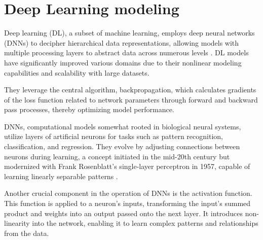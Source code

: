\section{Deep Learning modeling}

Deep learning (DL), a subset of machine learning, employs deep neural networks (DNNs) to decipher hierarchical data representations, allowing models with multiple processing layers to abstract data across numerous levels \cite{LeCun2015DeepLearning, Sarker2021DeepDirections}. DL models have significantly improved various domains due to their nonlinear modeling capabilities and scalability with large datasets.

They leverage the central algorithm, backpropagation, which calculates gradients of the loss function related to network parameters through forward and backward pass processes, thereby optimizing model performance.



DNNs, computational models somewhat rooted in biological neural systems, utilize layers of artificial neurons for tasks such as pattern recognition, classification, and regression. They evolve by adjusting connections between neurons during learning, a concept initiated in the mid-20th century but modernized with Frank Rosenblatt's single-layer perceptron in 1957, capable of learning linearly separable patterns \cite{perceptron}.



Another crucial component in the operation of DNNs is the activation function. This function is applied to a neuron's inputs, transforming the input's summed product and weights into an output passed onto the next layer. It introduces non-linearity into the network, enabling it to learn complex patterns and relationships from the data.



\newpage